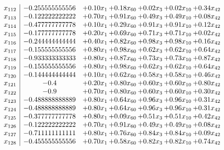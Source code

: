 \documentclass[8pt]{article}
\begin{document}
\[\begin{array}{c| c c@{\hskip 2pt} c@{\hskip 2pt} c@{\hskip 2pt} c@{\hskip 2pt} c@{\hskip 2pt} }
 x_{112}   &  -0.255555555556 & +  0.10 x_{1} & +  0.18 x_{60} & +  0.02 x_{3} & +  0.02 x_{10} & +  0.34 x_{42}\\
 x_{113}   &  -0.122222222222 & +  0.70 x_{1} & +  0.91 x_{60} & +  0.49 x_{3} & +  0.49 x_{10} & +  0.08 x_{42}\\
 x_{114}   &  -0.477777777778 & +  0.10 x_{1} & +  0.29 x_{60} & +  0.91 x_{3} & +  0.91 x_{10} & +  0.12 x_{42}\\
 x_{115}   &  -0.177777777778 & +  0.20 x_{1} & +  0.69 x_{60} & +  0.71 x_{3} & +  0.71 x_{10} & +  0.02 x_{42}\\
 x_{116}   &  -0.244444444444 & +  0.40 x_{1} & +  0.82 x_{60} & +  0.98 x_{3} & +  0.98 x_{10} & +  0.16 x_{42}\\
 x_{117}   &  -0.155555555556 & +  0.80 x_{1} & +  0.98 x_{60} & +  0.62 x_{3} & +  0.62 x_{10} & +  0.64 x_{42}\\
 x_{118}   &  -0.933333333333 & +  0.80 x_{1} & +  0.87 x_{60} & +  0.73 x_{3} & +  0.73 x_{10} & +  0.87 x_{42}\\
 x_{119}   &  -0.155555555556 & +  0.80 x_{1} & +  0.98 x_{60} & +  0.62 x_{3} & +  0.62 x_{10} & +  0.64 x_{42}\\
 x_{120}   &  -0.144444444444 & +  0.10 x_{1} & +  0.62 x_{60} & +  0.58 x_{3} & +  0.58 x_{10} & +  0.46 x_{42}\\
 x_{121}   &  -0.4 & +  0.20 x_{1} & +  0.80 x_{60} & +  0.60 x_{3} & +  0.60 x_{10} & +  0.80 x_{42}\\
 x_{122}   &  -0.9 & +  0.70 x_{1} & +  0.80 x_{60} & +  0.60 x_{3} & +  0.60 x_{10} & +  0.30 x_{42}\\
 x_{123}   &  -0.488888888889 & +  0.80 x_{1} & +  0.64 x_{60} & +  0.96 x_{3} & +  0.96 x_{10} & +  0.31 x_{42}\\
 x_{124}   &  -0.488888888889 & +  0.80 x_{1} & +  0.64 x_{60} & +  0.96 x_{3} & +  0.96 x_{10} & +  0.31 x_{42}\\
 x_{125}   &  -0.377777777778 & +  0.80 x_{1} & +  0.09 x_{60} & +  0.51 x_{3} & +  0.51 x_{10} & +  0.42 x_{42}\\
 x_{126}   &  -0.122222222222 & +  0.70 x_{1} & +  0.91 x_{60} & +  0.49 x_{3} & +  0.49 x_{10} & +  0.08 x_{42}\\
 x_{127}   &  -0.711111111111 & +  0.80 x_{1} & +  0.76 x_{60} & +  0.84 x_{3} & +  0.84 x_{10} & +  0.09 x_{42}\\
 x_{128}   &  -0.455555555556 & +  0.70 x_{1} & +  0.58 x_{60} & +  0.82 x_{3} & +  0.82 x_{10} & +  0.74 x_{42}\\

\end{array}\]
\end{document}
